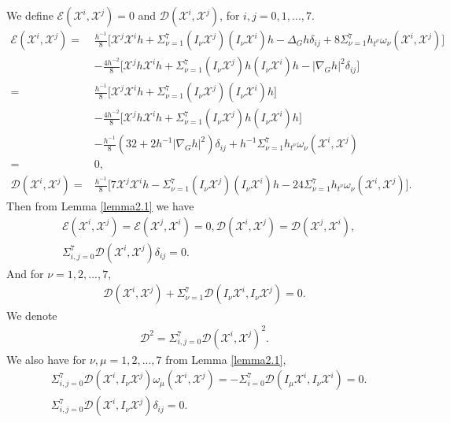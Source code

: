 \documentclass[10pt,a4paper]{amsart}
\numberwithin{equation}{section}
\begin{document}
We define $\mathcal{E}(\mathscr{X}^i,\mathscr{X}^j)=0$  and $\mathcal{D}(\mathscr{X}^i,\mathscr{X}^j)$, for $i,j =0,1,...,7.$
\begin{align*}
   \mathcal{E}(\mathscr{X}^i,\mathscr{X}^j)=&\frac{h^{-1}}{8}\bigg[\mathscr{X}^j\mathscr{X}^ih+\Sigma_{\nu=1}^7(I_\nu \mathscr{X}^j)(I_\nu \mathscr{X}^i) h-\Delta_G h \delta_{ij}+8\Sigma_{\nu=1}^7h_{t^\nu}\omega_\nu(\mathscr{X}^i,\mathscr{X}^j)\bigg]\\&-\frac{4h^{-2}}{8}\bigg[\mathscr{X}^jh\mathscr{X}^ih+\Sigma_{\nu=1}^7(I_\nu \mathscr{X}^j)h(I_\nu \mathscr{X}^i) h-|\nabla_G h|^2\delta_{ij}\bigg]\\
   =&\frac{h^{-1}}{8}\bigg[\mathscr{X}^j\mathscr{X}^ih+\Sigma_{\nu=1}^7(I_\nu \mathscr{X}^j)(I_\nu \mathscr{X}^i) h\bigg]\\&-\frac{4h^{-2}}{8}\bigg[\mathscr{X}^jh\mathscr{X}^ih+\Sigma_{\nu=1}^7(I_\nu \mathscr{X}^j)h(I_\nu \mathscr{X}^i) h\bigg]\\&
   -\frac{h^{-1}}{8}(32+2h^{-1}|\nabla_G h|^2)\delta_{ij}+h^{-1}\Sigma_{\nu=1}^7h_{t^\nu}\omega_\nu(\mathscr{X}^i,\mathscr{X}^j)\\=&0,\\
   \mathcal{D}(\mathscr{X}^i,\mathscr{X}^j)=&\frac{h^{-1}}{8}\bigg[7\mathscr{X}^j\mathscr{X}^ih-\Sigma_{\nu=1}^7(I_\nu \mathscr{X}^j)(I_\nu \mathscr{X}^i) h-24\Sigma_{\nu=1}^7h_{t^\nu}\omega_\nu(\mathscr{X}^i,\mathscr{X}^j)\bigg].
    \end{align*}
Then from Lemma \ref{lemma2.1} we have
\begin{equation}\label{3.3}
\begin{aligned}
     &\mathcal{E}(\mathscr{X}^i,\mathscr{X}^j)=\mathcal{E}(\mathscr{X}^j,\mathscr{X}^i)=0,\mathcal{D}(\mathscr{X}^i,\mathscr{X}^j)=\mathcal{D}(\mathscr{X}^j,\mathscr{X}^i),\\
     &\Sigma_{i,j=0}^7\mathcal{D}(\mathscr{X}^i,\mathscr{X}^j)\delta_{ij}=0.    \end{aligned}
\end{equation}
And for $\nu=1,2,...,7$,
\begin{align}\label{3.4}
    \mathcal{D}(\mathscr{X}^i,\mathscr{X}^j)+\Sigma_{\nu=1}^7\mathcal{D}(I_\nu \mathscr{X}^i,I_\nu \mathscr{X}^j)=0.
\end{align}
We denote 
    \begin{align}
        \mathcal{D}^2=\Sigma_{i,j=0}^7\mathcal{D}(\mathscr{X}^i,\mathscr{X}^j)^2.   \end{align}
We also have for $\nu,\mu=1,2,...,7$ from Lemma \ref{lemma2.1},
 \begin{equation}\label{3.6}
 \begin{aligned}
& \Sigma_{i,j=0}^7\mathcal{D}(\mathscr{X}^i,I_\nu \mathscr{X}^j)\omega_\mu(\mathscr{X}^i,\mathscr{X}^j)=-\Sigma_{i=0}^7\mathcal{D}(I_\mu \mathscr{X}^i, I_\nu \mathscr{X}^i)=0.\\&\Sigma_{i,j=0}^7\mathcal{D}(\mathscr{X}^i, I_\nu\mathscr{X}^j)\delta_{ij}=0.
 \end{aligned}
 \end{equation}
\end{document}
